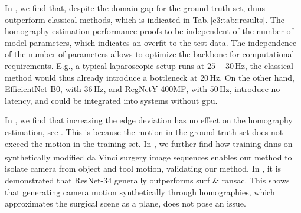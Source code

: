 In , we find that, despite the domain gap for the ground truth set, \gls{dnn}s outperform classical methods, which is indicated in Tab.\,\ref{c3:tab::results}. The homography estimation performance proofs to be independent of the number of model parameters, which indicates an overfit to the test data. The independence of the number of parameters allows to optimize the backbone for computational requirements. E.g., a typical laparoscopic setup runs at $25-30\,\text{Hz}$, the classical method would thus already introduce a bottleneck at $20\,\text{Hz}$. On the other hand, EfficientNet-B0, with $36\,\text{Hz}$, and RegNetY-400MF, with $50\,\text{Hz}$, introduce no latency, and could be integrated into systems without \gls{gpu}.


In , we find that increasing the edge deviation has no effect on the homography estimation, see . This is because the motion in the ground truth set does not exceed the motion in the training set. In , we further find how training \gls{dnn}s on synthetically modified da Vinci\textsuperscript{\textregistered} surgery image sequences enables our method to isolate camera from object and tool motion, validating our method. In , it is demonstrated that ResNet-34 generally outperforms \gls{surf} \& \gls{ransac}. This shows that generating camera motion synthetically through homographies, which approximates the surgical scene as a plane, does not pose an issue.

